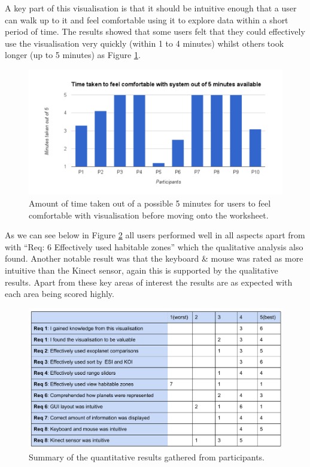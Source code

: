A key part of this visualisation is that it should be intuitive enough that a
user can walk up to it and feel comfortable using it to explore data within a
short period of time. The results showed that some users felt that they could
effectively use the visualisation very quickly (within 1 to 4 minutes) whilst
others took longer (up to 5 minutes) as Figure \ref{fig:comfort}. 
\begin{figure}[H]
  \centering
      \includegraphics[width=1\textwidth]{images/comfort.pdf}
  \caption{Amount of time taken out of a possible 5 minutes for users to feel
comfortable with
visualisation before moving onto the worksheet. }  
\label{fig:comfort}
\end{figure}

As we can see below in Figure \ref{fig:summary} all users performed well in all
aspects apart from with ``Req: 6 Effectively used habitable zones'' which the
qualitative analysis also found. Another notable result was that the keyboard \&
mouse was rated as more intuitive than the Kinect sensor, again this is
supported by the qualitative results. Apart from these key areas of interest the
results are as expected with each area being scored highly. 
\begin{figure}[H]
\centering
      \includegraphics[width=1\textwidth]{images/summaryResults.pdf}
  \caption{Summary of the quantitative results gathered from participants.}  
    \label{fig:summary}
    \end{figure}
    

